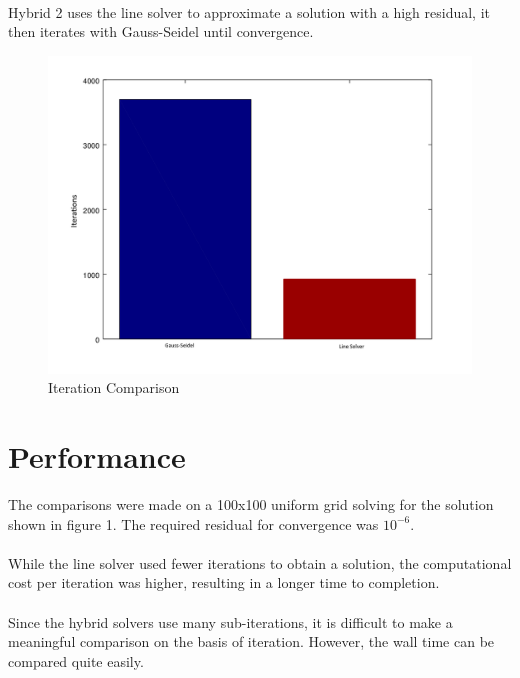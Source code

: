 \documentclass[12pt,twocolumn]{article}
\begin{document}
\paragraph{}Hybrid 2 uses the line solver to approximate a solution with a high residual, it then iterates with Gauss-Seidel until convergence.

\begin{figure}
\label{fig:solution}
\includegraphics[width=\columnwidth]{plot/iterations.png}
\footnotesize{\caption{Iteration Comparison}}
\end{figure}

\section*{Performance}
The comparisons were made on a 100x100 uniform grid solving for the solution shown in figure 1. The required residual for convergence was $10^{-6}$.
\paragraph{}
While the line solver used fewer iterations to obtain a solution, the computational cost per iteration was higher, resulting in a longer time to completion.
\paragraph{}
Since the hybrid solvers use many sub-iterations, it is difficult to make a meaningful comparison on the basis of iteration.
However, the wall time can be compared quite easily.
\end{document}
